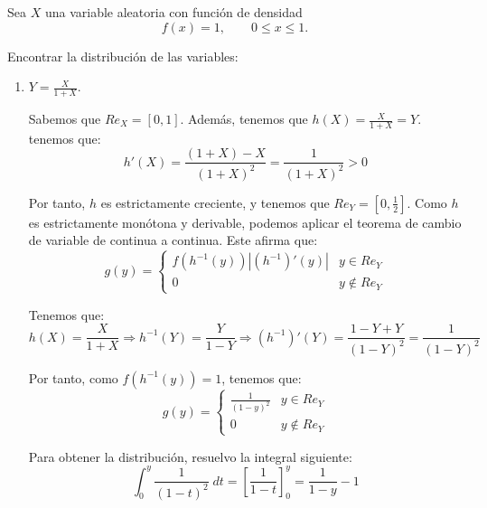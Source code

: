 \begin{ejercicio}
    Sea $X$ una variable aleatoria con función de densidad
    \begin{equation*}
        f(x) = 1,\qquad  0 \leq x \leq 1.
    \end{equation*}

    Encontrar la distribución de las variables:
    \begin{enumerate}
        \item $\displaystyle Y=\frac{X}{1+X}$.

        Sabemos que $Re_X=[0,1]$. Además, tenemos que $h(X)=\frac{X}{1+X}=Y$. tenemos que:
        \begin{equation*}
            h'(X) = \frac{(1+X)-X}{(1+X)^2} = \frac{1}{(1+X)^2} >0
        \end{equation*}

        Por tanto, $h$ es estrictamente creciente, y tenemos que $Re_Y=\left[0,\frac{1}{2}\right]$. Como $h$ es estrictamente monótona y derivable, podemos aplicar el teorema de cambio de variable de continua a continua. Este afirma que:
        \begin{equation*}
            g(y)=\left\{\begin{array}{cc}
                f(h^{-1}(y))|(h^{-1})'(y)| & y\in Re_Y \\
                0 & y\notin Re_Y
            \end{array}\right.
        \end{equation*}

        Tenemos que:
        \begin{equation*}
            h(X)=\frac{X}{1+X} \Longrightarrow h^{-1}(Y)=\frac{Y}{1-Y}
            \Longrightarrow (h^{-1})'(Y) = \frac{1-Y +Y}{(1-Y)^2} = \frac{1}{(1-Y)^2}
        \end{equation*}

        Por tanto, como $f(h^{-1}(y))=1$, tenemos que:
        \begin{equation*}
            g(y)=\left\{\begin{array}{cc}
                \frac{1}{(1-y)^2} & y\in Re_Y \\
                0 & y\notin Re_Y
            \end{array}\right.
        \end{equation*}

        Para obtener la distribución, resuelvo la integral siguiente:
        \begin{equation*}
            \int_0^y \frac{1}{(1-t)^2}\;dt = \left[\frac{1}{1-t}\right]_0^y = \frac{1}{1-y}-1
        \end{equation*}



\end{enumerate}
\end{ejercicio}
